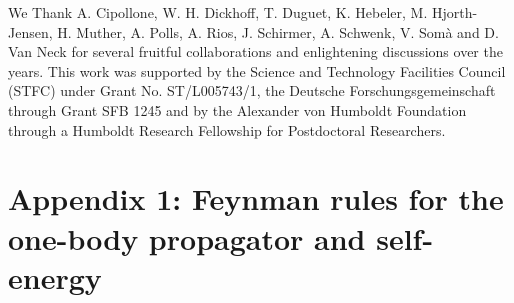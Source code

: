 

\begin{acknowledgement}
We Thank A. Cipollone, W. H. Dickhoff, T. Duguet, K. Hebeler, M. Hjorth-Jensen, H. Muther, A. Polls, A. Rios, J. Schirmer, A. Schwenk, V. Som\`a and D. Van Neck  for several fruitful collaborations and  enlightening discussions over the years.
%
This work was supported by the Science and Technology Facilities Council (STFC) under Grant No. ST/L005743/1, %
the  Deutsche Forschungsgemeinschaft through Grant SFB 1245
and by the Alexander von Humboldt Foundation through a Humboldt Research Fellowship for Postdoctoral Researchers.
\end{acknowledgement}
%

\section*{Appendix 1: Feynman rules for the one-body propagator and self-energy}
\label{app:Feyn_rules}

